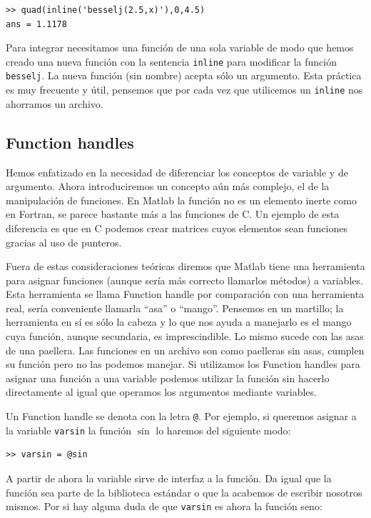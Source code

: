 \begin{verbatim}
>> quad(inline('besselj(2.5,x)'),0,4.5)
ans = 1.1178
\end{verbatim}

Para integrar necesitamos una función de una sola variable de modo que
hemos creado una nueva función con la sentencia \texttt{inline} para
modificar la función \texttt{besselj}. La nueva función (sin nombre)
acepta sólo un argumento. Esta práctica es muy frecuente y útil,
pensemos que por cada vez que utilicemos un \texttt{inline} nos
ahorramos un archivo.


\subsection{Function handles}

Hemos enfatizado en la necesidad de diferenciar los conceptos de
variable y de argumento. Ahora introduciremos un concepto aún más
complejo, el de la manipulación de funciones. En Matlab la función no
es un elemento inerte como en Fortran, se parece bastante más a las
funciones de C. Un ejemplo de esta diferencia es que en C podemos
crear matrices cuyos elementos sean funciones gracias al uso de
punteros.

Fuera de estas consideraciones teóricas diremos que Matlab tiene una
herramienta para asignar funciones (aunque sería más correcto
llamarlos métodos) a variables. Esta herramienta se llama Function
handle por comparación con una herramienta real, sería conveniente
llamarla {}``asa'' o {}``mango''. Pensemos en un martillo; la
herramienta en sí es sólo la cabeza y lo que nos ayuda a manejarlo es
el mango cuya función, aunque secundaria, es imprescindible. Lo mismo
sucede con las asas de una paellera. Las funciones en un archivo son
como paelleras sin asas, cumplen su función pero no las podemos
manejar. Si utilizamos los Function handles para asignar una función a
una variable podemos utilizar la función sin hacerlo directamente al
igual que operamos los argumentos mediante variables.

Un Function handle se denota con la letra \texttt{@}. Por ejemplo, si
queremos asignar a la variable \texttt{varsin} la función $\sin$ lo
haremos del siguiente modo:

\begin{verbatim}
>> varsin = @sin
\end{verbatim}
A partir de ahora la variable sirve de interfaz a la función. Da igual
que la función sea parte de la biblioteca estándar o que la acabemos
de escribir nosotros mismos. Por si hay alguna duda de que
\texttt{varsin} es ahora la función seno:

